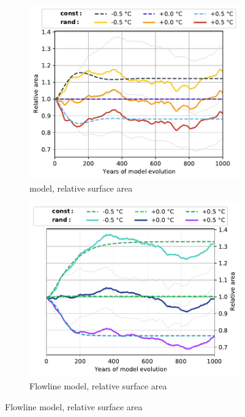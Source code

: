 \begin{figure}[htp]
\begin{subfigure}[b]{0.476\textwidth}
          \end{subfigure}
          \begin{subfigure}[b]{0.476\textwidth}
            \caption{\Vas{} model, relative surface area}
            \label{fig:hintereisferner:area_vas}
            \centering
            \includegraphics[width=\textwidth]{../plots/final_plots/time_series/single_glaciers/area_norm_vas_Hintereisferner.pdf}
          \end{subfigure}
          \hfill
          \begin{subfigure}[b]{0.476\textwidth}
            \caption{Flowline model, relative surface area}
            \label{fig:hintereisferner:area_fl}
            \centering
            \includegraphics[width=\textwidth]{../plots/final_plots/time_series/single_glaciers/area_norm_fl_Hintereisferner.pdf}

\end{subfigure}
\end{figure}
